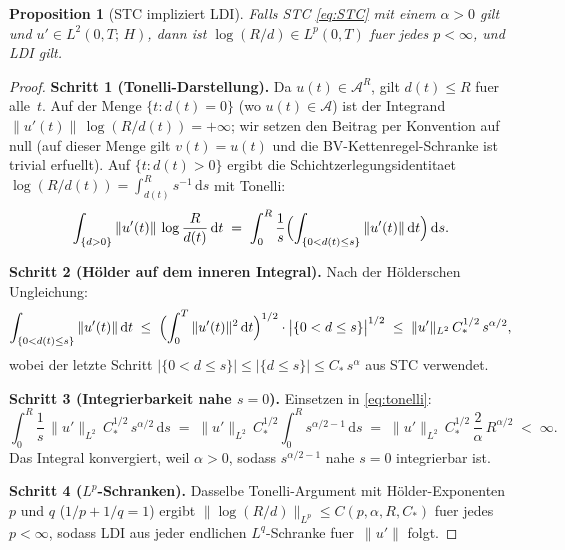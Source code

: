 \documentclass[12pt,a4paper]{article}
\theoremstyle{definition}
\theoremstyle{plain}
\newtheorem{proposition}[definition]{Proposition}
\theoremstyle{remark}
\begin{document}
\begin{proposition}[STC impliziert LDI]
\label{prop:variant-B}
Falls STC \eqref{eq:STC} mit einem $\alpha > 0$ gilt und
$u' \in L^2(0,T;\,H)$, dann ist
$\log(R/d) \in L^p(0,T)$ fuer jedes $p < \infty$, und LDI gilt.
\end{proposition}

\begin{proof}
\textbf{Schritt 1 (Tonelli-Darstellung).}\;
Da $u(t) \in \mathcal{A}^R$, gilt $d(t) \le R$ fuer alle~$t$.
Auf der Menge $\{t : d(t) = 0\}$ (wo $u(t) \in \mathcal{A}$) ist
der Integrand $\|u'(t)\|\,\log(R/d(t)) = +\infty$; wir setzen den
Beitrag per Konvention auf null (auf dieser Menge gilt $v(t) = u(t)$
und die BV-Kettenregel-Schranke ist trivial erfuellt).
Auf $\{t : d(t) > 0\}$ ergibt die Schichtzerlegungsidentitaet
$\log(R/d(t)) = \int_{d(t)}^{R} s^{-1}\,\mathrm{d}s$ mit Tonelli:
\begin{equation}\label{eq:tonelli}
  \int_{\{d>0\}} \|u'(t)\|\,\log\frac{R}{d(t)}\,\mathrm{d}t
  \;=\;
  \int_0^R \frac{1}{s}
  \Bigl(\int_{\{0 < d(t) \le s\}} \|u'(t)\|\,\mathrm{d}t\Bigr)
  \,\mathrm{d}s.
\end{equation}

\medskip
\noindent
\textbf{Schritt 2 (H\"older auf dem inneren Integral).}\;
Nach der H\"olderschen Ungleichung:
\[
  \int_{\{0<d(t)\le s\}} \|u'(t)\|\,\mathrm{d}t
  \;\le\;
  \Bigl(\int_0^T \|u'(t)\|^2\,\mathrm{d}t\Bigr)^{1/2}
  \cdot
  \bigl|\{0 < d \le s\}\bigr|^{1/2}
  \;\le\;
  \|u'\|_{L^2}\,C_*^{1/2}\,s^{\alpha/2},
\]
wobei der letzte Schritt $|\{0<d\le s\}| \le |\{d\le s\}|
\le C_*\,s^\alpha$ aus STC verwendet.

\medskip
\noindent
\textbf{Schritt 3 (Integrierbarkeit nahe $s=0$).}\;
Einsetzen in \eqref{eq:tonelli}:
\[
  \int_0^R \frac{1}{s}\,\|u'\|_{L^2}\,C_*^{1/2}\,s^{\alpha/2}
  \,\mathrm{d}s
  \;=\;
  \|u'\|_{L^2}\,C_*^{1/2}
  \int_0^R s^{\alpha/2 - 1}\,\mathrm{d}s
  \;=\;
  \|u'\|_{L^2}\,C_*^{1/2}\,
  \frac{2}{\alpha}\,R^{\alpha/2}
  \;<\; \infty.
\]
Das Integral konvergiert, weil $\alpha > 0$, sodass
$s^{\alpha/2-1}$ nahe $s=0$ integrierbar ist.

\medskip
\noindent
\textbf{Schritt 4 ($L^p$-Schranken).}\;
Dasselbe Tonelli-Argument mit H\"older-Exponenten $p$ und $q$
($1/p + 1/q = 1$) ergibt
$\|\log(R/d)\|_{L^p} \le C(p,\alpha,R,C_*)$ fuer jedes
$p < \infty$, sodass LDI aus jeder endlichen $L^q$-Schranke
fuer~$\|u'\|$ folgt.
\end{proof}
\end{document}
